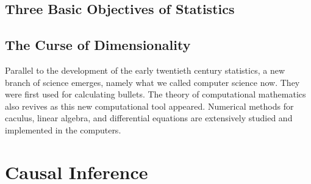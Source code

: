 \documentclass{book}
\begin{document}
\chapter{Three Basic Objectives of Statistics}


\chapter{The Curse of Dimensionality}
Parallel to the development of the early twentieth century statistics, a new branch of science emerges, namely what we called computer science now.
They were first used for calculating bullets. The theory of computational mathematics also revives as this new computational tool appeared. 
Numerical methods for caculus, linear algebra, and differential equations are extensively studied and implemented in the computers.


\chapter{}







\part{Causal Inference}





%
\end{document}
